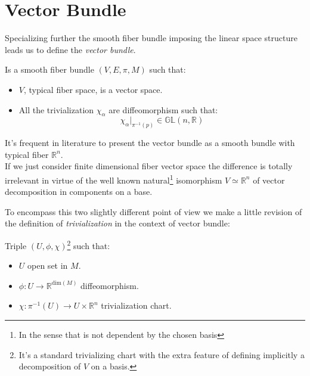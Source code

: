 \documentclass[a4paper,12pt]{scrartcl}    %
\begin{document}
	


\newpage
\section{Vector Bundle}
Specializing further the smooth fiber bundle imposing the linear space structure leads us to define the \emph{vector bundle}.

\begin{definition}
Is  a smooth fiber bundle $(V,E, \pi, M )$ such that:
\begin{itemize}
\item $V$, typical fiber space, is a vector space.
\item All the trivialization $\chi_{\alpha} $ are diffeomorphism such that:
\begin{displaymath}
	\chi_{\alpha}\vert_{\pi^{-1}(p)} \in \mathbb{GL}(n, \mathbb{R})
\end{displaymath}
\end{itemize}
\end{definition}

\begin{observation}
It's frequent in literature to present the vector bundle as a smooth bundle with typical fiber $\mathbb{R}^n$.
\\
If we just consider finite dimensional fiber vector space the difference is totally irrelevant in virtue of the well known natural\footnote{In the sense that is not dependent by the chosen basis } isomorphism $V\simeq \mathbb{R}^n$ of vector decomposition in components on a base.
\end{observation}
To encompass this two slightly different point of view we make a little revision of the definition of \emph{trivialization} in the context of vector bundle:

\begin{definition}
Triple $(U, \phi, \chi)$\footnote{It's a standard trivializing chart with the extra feature of defining implicitly a decomposition of $V$ on a basis.} such that:
\begin{itemize}
\item $U$ open set in $M$.
\item $\phi: U \rightarrow \mathbb{R}^{\textrm{dim}(M)}$ diffeomorphism.
\item $\chi: \pi^{-1}(U) \rightarrow U \times \mathbb{R}^n $ trivialization chart.
\end{itemize} 
\end{definition}
\end{document}
